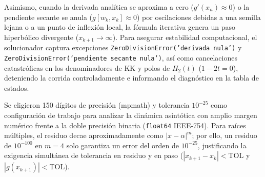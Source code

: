 \documentclass[10pt,a4paper]{article}
\begin{document}
Asimismo, cuando la derivada anal\'itica se aproxima a cero ($g'(x_n)\approx 0$) o la pendiente secante se anula ($g[w_k,x_k]\approx 0$) por oscilaciones debidas a una semilla lejana o a un punto de inflexi\'on local, la f\'ormula iterativa genera un paso hiperb\'olico divergente ($x_{k+1}\to\infty$). Para asegurar estabilidad computacional, el solucionador captura excepciones \texttt{ZeroDivisionError('derivada nula')} y \texttt{ZeroDivisionError('pendiente secante nula')}, as\'i como cancelaciones catastr\'oficas en los denominadores de KK y polos de $H_2(t)$ ($1-2t=0$), deteniendo la corrida controladamente e informando el diagn\'ostico en la tabla de estados.

Se eligieron 150 d\'igitos de precisi\'on (mpmath) y tolerancia $10^{-25}$ como configuraci\'on de trabajo para analizar la din\'amica asint\'otica con amplio margen num\'erico frente a la doble precisi\'on binaria (\texttt{float64} IEEE-754). Para ra\'ices m\'ultiples, el residuo decae aproximadamente como $|x-\alpha|^m$; por ello, un residuo de $10^{-100}$ en $m=4$ solo garantiza un error del orden de $10^{-25}$, justificando la exigencia simult\'anea de tolerancia en residuo y en paso ($|x_{k+1}-x_k|<\mathrm{TOL}$ y $|g(x_{k+1})|<\mathrm{TOL}$).
\end{document}
